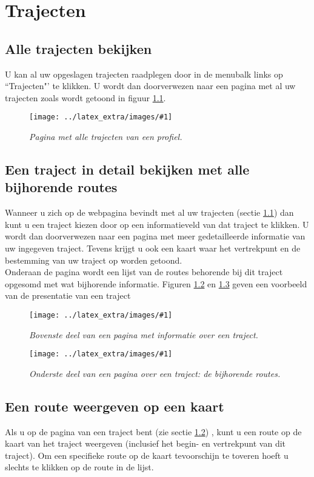 \documentclass[11pt,twoside,a4paper]{report}
\newcommand*{\copyimageH}[4]{ 			%
	\begin{figure}[Ht]
	\texttt{[image: ../latex\_extra/images/\#1]}
	\caption{\textit{#4}}\label{#2}
	\end{figure}
}
\begin{document}


\chapter{Trajecten}
	
\section{Alle trajecten bekijken}\label{all_trav}
U kan al uw opgeslagen trajecten raadplegen door in de menubalk links op ``Trajecten"' te klikken. U wordt dan doorverwezen naar een pagina met al uw trajecten zoals wordt getoond in figuur \ref{travel_list_pg}.
\copyimageH{travel_list.jpg}{travel_list_pg}{\textwidth}{Pagina met alle trajecten van een profiel.}


		\section{Een traject in detail bekijken met alle bijhorende routes}\label{one_trav}
Wanneer u zich op de webpagina bevindt met al uw trajecten (sectie \ref{all_trav}) dan kunt u een traject kiezen door op een informatieveld van dat traject te klikken. U wordt dan doorverwezen naar een pagina met meer gedetailleerde informatie van uw ingegeven traject. Tevens krijgt u ook een kaart waar het vertrekpunt en de bestemming van uw traject op worden getoond.\\
Onderaan de pagina wordt een lijst van de routes behorende bij dit traject opgesomd met wat bijhorende informatie.
Figuren \ref{travel_show_pge} en \ref{travel_routes_pge} geven een voorbeeld van de presentatie van een traject
\copyimageH{travel_show_1.jpg}{travel_show_pge}{\textwidth}{Bovenste deel van een pagina met informatie over een traject.}
\copyimageH{travel_show_2.jpg}{travel_routes_pge}{\textwidth}{Onderste deel van een pagina over een traject: de bijhorende routes.}

		\section{Een route weergeven op een kaart}\label{one_route}
Als u op de pagina van een traject bent (zie sectie \ref{one_trav}) , kunt u een route op de kaart van het traject weergeven (inclusief het begin- en vertrekpunt van dit traject). Om een specifieke route op de kaart tevoorschijn te toveren hoeft u slechts te klikken op de route in de lijst.
\end{document}

